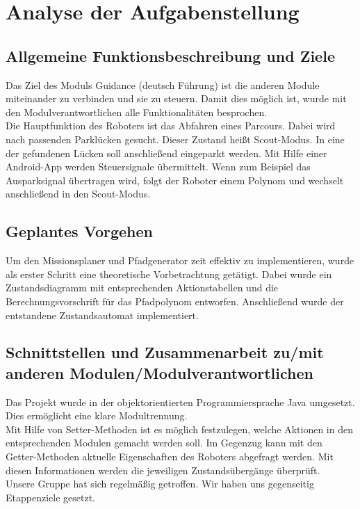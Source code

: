 \chapter{Analyse der Aufgabenstellung}


\section{Allgemeine Funktionsbeschreibung und Ziele}

Das Ziel des Moduls Guidance (deutsch Führung) ist die anderen Module miteinander zu verbinden und sie zu steuern. 
Damit dies möglich ist, wurde mit den Modulverantwortlichen alle Funktionalitäten besprochen. \\

\noindent Die Hauptfunktion des Roboters ist das Abfahren eines Parcours. Dabei wird nach passenden Parklücken gesucht. Dieser Zustand heißt Scout-Modus.
In eine der gefundenen Lücken soll anschließend eingeparkt werden. Mit Hilfe einer Android-App werden Steuersignale übermittelt. Wenn zum Beispiel das Ausparksignal übertragen wird, folgt der Roboter einem Polynom und wechselt anschließend in den Scout-Modus.

\section{Geplantes Vorgehen}

Um den Missionsplaner und Pfadgenerator zeit effektiv zu implementieren, wurde als erster Schritt eine theoretische Vorbetrachtung getätigt. Dabei wurde ein Zustandsdiagramm mit entsprechenden Aktionstabellen und die Berechnungsvorschrift für das Pfadpolynom entworfen. Anschließend wurde der entstandene Zustandsautomat implementiert.

\section{Schnittstellen und Zusammenarbeit zu/mit anderen Modulen/Modulverantwortlichen}

Das Projekt wurde in der objektorientierten Programmiersprache Java umgesetzt. Dies ermöglicht eine klare Modultrennung.\\


\noindent Mit Hilfe von Setter-Methoden ist es möglich festzulegen, welche Aktionen in den entsprechenden Modulen gemacht werden soll.
Im Gegenzug kann mit den Getter-Methoden aktuelle Eigenschaften des Roboters abgefragt werden. Mit diesen Informationen werden die jeweiligen Zustandsübergänge überprüft.\\

\noindent Unsere Gruppe hat sich regelmäßig getroffen. Wir haben uns gegenseitig Etappenziele gesetzt.